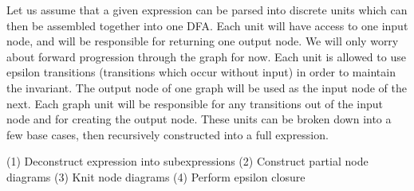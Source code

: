 \documentclass[8pt]{amsart}
\begin{document}
    Let us assume that a given expression can be parsed into
    discrete units which can then be assembled together into one
    DFA. Each unit will have access to one input node, and will
    be responsible for returning one output node. We will only
    worry about forward progression through the graph for now.
    Each unit is allowed to use epsilon transitions (transitions
    which occur without input) in order to maintain the
    invariant. The output node of one graph will be used as the
    input node of the next. Each graph unit will be responsible
    for any transitions out of the input node and for creating
    the output node. These units can be broken down into a few
    base cases, then recursively constructed into a full
    expression.

    (1) Deconstruct expression into subexpressions
    (2) Construct partial node diagrams
    (3) Knit node diagrams
    (4) Perform epsilon closure
\end{document}
